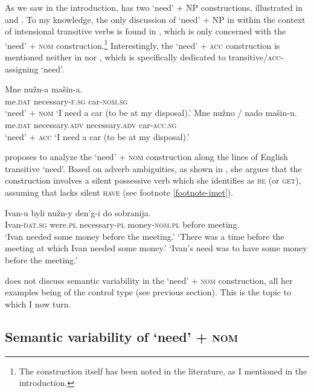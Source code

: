 \documentclass[output=paper]{langscibook}
\begin{document}
As we saw in the introduction,  has two `need' + NP constructions, illustrated in  and . To my knowledge, the only discussion of `need' + NP in  within the context of intensional transitive verbs is found in \citet{Harves2008}, which is only concerned with the `need' + \textsc{nom} construction.\footnote{The construction itself has been noted in the literature, as I mentioned in the introduction.} Interestingly, the `need' + \textsc{acc} construction is mentioned neither in \citet{Harves2008} nor \citet{Harves.Kayne2012}, which is specifically dedicated to transitive/\textsc{acc}-assigning `need'.

\ea
\ea \gll Mne nužn-a mašin-a.\\
     me.\textsc{dat} necessary-\textsc{f.sg} car-\textsc{nom.sg}\\ \hfill `need' + \textsc{nom}
\glt `I need a car (to be at my disposal).'\label{need-nom-rep}
\ex \gll Mne nužno / nado mašin-u.\\
     me.\textsc{dat} necessary.\textsc{adv} {} necessary.\textsc{adv} car-\textsc{acc.sg}\\ \hfill `need' + \textsc{acc}
\glt `I need a car (to be at my disposal).'\label{need-acc-rep}
\z \z

\noindent \citet{Harves2008} proposes to analyze the `need' + \textsc{nom} construction along the lines of English transitive `need'. Based on adverb ambiguities, as shown in , she argues that the construction involves a silent possessive verb which she identifies as \textsc{be} (or \textsc{get}), assuming that  lacks silent \textsc{have} (see footnote \ref{footnote-imet}).

\ea \gll Ivan-u byli nužn-y den'g-i do sobranija.\\
Ivan-\textsc{dat.sg} were.\textsc{pl} necessary-\textsc{pl} money-\textsc{nom.pl} before  meeting.\\
\glt `Ivan needed some money before the meeting.'
\ea `There was a time before the meeting at which Ivan needed some money.'
\ex `Ivan's need was to have some money before the meeting.'\\
\hfill \citep[216]{Harves2008}
\label{nuzhen-harves}
\z\z

\noindent \citet{Harves2008} does not discuss semantic variability in the `need' + \textsc{nom} construction, all her examples being of the control type (see previous section). This is the topic to which I now turn.

\subsection{Semantic variability of `need' + \textsc{nom}}\label{section-nom-variability}
\end{document}
